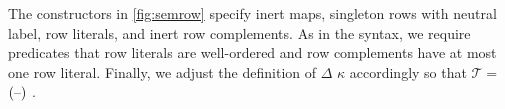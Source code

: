 \documentclass[sigplan,screen]{acmart}
\begin{document}
The constructors in \cref{fig:semrow} specify inert maps, singleton rows with neutral label, row literals, and inert row complements. As in the syntax, we require predicates that row literals are well-ordered and row complements have at most one row literal. Finally, we adjust the definition of  $\Delta$ \Constructor{R[} $\kappa$ \Constructor{]} accordingly so that $\mathcal T =$  $(\text{--})$ .

\begin{AgdaAlign}
\begin{code}[hide]%
%
\>[2]\AgdaSpace{}%
\AgdaSymbol{:}\AgdaSpace{}%
\AgdaSpace{}%
\AgdaSpace{}%
\AgdaSpace{}%
\AgdaSpace{}%
\<%
\end{code}
\begin{code}%
%
\>[2]\AgdaSpace{}%
\AgdaSpace{}%
\AgdaOperator{\AgdaInductiveConstructor{R[}}\AgdaSpace{}%
\AgdaSpace{}%
\AgdaOperator{\AgdaInductiveConstructor{]}}\AgdaSpace{}%
\AgdaSymbol{=}\<%
\\
\>[2][@{}l@{\AgdaIndent{0}}]%
\>[4]\AgdaSpace{}%
\AgdaSpace{}%
\AgdaSpace{}%
\AgdaSpace{}%
\AgdaSpace{}%
\AgdaSpace{}%
\AgdaSpace{}%
\AgdaSymbol{)}\AgdaSpace{}%
\AgdaOperator{\AgdaInductiveConstructor{R[}}\AgdaSpace{}%
\AgdaSpace{}%
\AgdaOperator{\AgdaInductiveConstructor{]}}\<%
\end{code}
\begin{code}[hide]%
%
\>[2]\AgdaSpace{}%
\AgdaSpace{}%
\AgdaSpace{}%
\AgdaSymbol{=}\AgdaSpace{}%
\AgdaSpace{}%
\AgdaSpace{}%
\<%
\\
%
\>[2]\AgdaSpace{}%
\AgdaSpace{}%
\AgdaSpace{}%
\AgdaSymbol{=}\AgdaSpace{}%
\AgdaSpace{}%
\AgdaSpace{}%
\<%
\\
%
\>[2]\AgdaSpace{}%
%
\>[994I]\AgdaSymbol{(}\AgdaSpace{}%
\AgdaSpace{}%
\AgdaSymbol{)}\AgdaSpace{}%
\AgdaSymbol{=}\AgdaSpace{}%
\AgdaSpace{}%
\AgdaSymbol{\{}\AgdaSymbol{\}}\AgdaSpace{}%
\AgdaSpace{}%
\AgdaSpace{}%
\AgdaSpace{}%
\AgdaSpace{}%
\<%
\\
\>[994I][@{}l@{\AgdaIndent{0}}]%
\>[14]\AgdaSpace{}%
\AgdaSpace{}%
\AgdaSpace{}%
\AgdaSpace{}%
\AgdaSpace{}%
\AgdaSpace{}%
\<%
\end{code}
\end{AgdaAlign}
\end{document}
